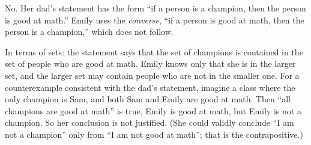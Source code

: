 No. Her dad's statement has the form ``if a person is a champion, then the person is good at math.'' Emily uses the \emph{converse}, ``if a person is good at math, then the person is a champion,'' which does not follow.

In terms of sets: the statement says that the set of champions is contained in the set of people who are good at math. Emily knows only that she is in the larger set, and the larger set may contain people who are not in the smaller one. For a counterexample consistent with the dad's statement, imagine a class where the only champion is Sam, and both Sam and Emily are good at math. Then ``all champions are good at math'' is true, Emily is good at math, but Emily is not a champion. So her conclusion is not justified. (She could validly conclude ``I am not a champion'' only from ``I am not good at math''; that is the contrapositive.)
